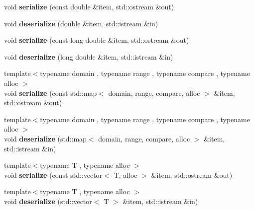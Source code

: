 \begin{DoxyCompactItemize}
\item 
\hypertarget{namespacedlib_aeda8e7a61ab291286b5ea316e8fc21c8}{
void {\bfseries serialize} (const double \&item, std::ostream \&out)}
\label{namespacedlib_aeda8e7a61ab291286b5ea316e8fc21c8}

\item 
\hypertarget{namespacedlib_a62b71c98cbea2ca79cae9f64e7cc8953}{
void {\bfseries deserialize} (double \&item, std::istream \&in)}
\label{namespacedlib_a62b71c98cbea2ca79cae9f64e7cc8953}

\item 
\hypertarget{namespacedlib_ad55b3e391e2ed4a3470170eadc37cf2c}{
void {\bfseries serialize} (const long double \&item, std::ostream \&out)}
\label{namespacedlib_ad55b3e391e2ed4a3470170eadc37cf2c}

\item 
\hypertarget{namespacedlib_aee37ef95181adb0209407e5be1f61503}{
void {\bfseries deserialize} (long double \&item, std::istream \&in)}
\label{namespacedlib_aee37ef95181adb0209407e5be1f61503}

\item 
\hypertarget{namespacedlib_a83a85a683fa3b9a5bc9cf742bf8bdf02}{
{\footnotesize template$<$typename domain , typename range , typename compare , typename alloc $>$ }\\void {\bfseries serialize} (const std::map$<$ domain, range, compare, alloc $>$ \&item, std::ostream \&out)}
\label{namespacedlib_a83a85a683fa3b9a5bc9cf742bf8bdf02}

\item 
\hypertarget{namespacedlib_a0b1b60f9c8429e5ab81c50994896dcf9}{
{\footnotesize template$<$typename domain , typename range , typename compare , typename alloc $>$ }\\void {\bfseries deserialize} (std::map$<$ domain, range, compare, alloc $>$ \&item, std::istream \&in)}
\label{namespacedlib_a0b1b60f9c8429e5ab81c50994896dcf9}

\item 
\hypertarget{namespacedlib_a5a7213bb6f1e0dcd5d2fc84ac6b29ff5}{
{\footnotesize template$<$typename T , typename alloc $>$ }\\void {\bfseries serialize} (const std::vector$<$ T, alloc $>$ \&item, std::ostream \&out)}
\label{namespacedlib_a5a7213bb6f1e0dcd5d2fc84ac6b29ff5}

\item 
\hypertarget{namespacedlib_a57405739e762674afe117eed2ce6a55f}{
{\footnotesize template$<$typename T , typename alloc $>$ }\\void {\bfseries deserialize} (std::vector$<$ T $>$ \&item, std::istream \&in)}
\label{namespacedlib_a57405739e762674afe117eed2ce6a55f}


\end{DoxyCompactItemize}
